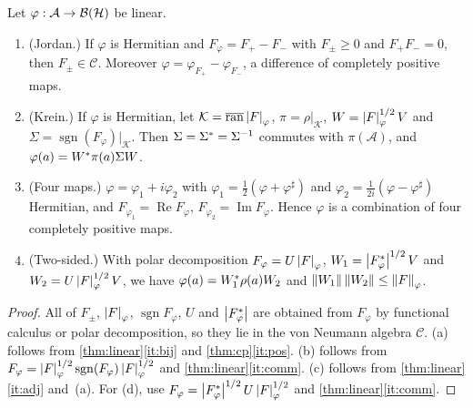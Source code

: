 \documentclass[12pt]{article}
\newcommand{\alg}{\mathcal{A}}             %
\newcommand{\hilb}{\mathcal{H}}            %
\newcommand{\dil}{\mathcal{K}}             %
\newcommand{\bdd}[1]{\mathcal{B}\br{#1}}   %
\newcommand{\Fphi}{F_{\varphi}}
\newcommand{\comm}{\mathcal{C}}            %
\newcommand{\ran}{\operatorname{ran}}
\begin{document}
\begin{theorem}
\label{thm:non-cp}
Let \(\varphi : \alg \to \bdd\hilb\) be linear.
\begin{enumerate}[label=(\alph*)]
  \item \label{it:jordan}
    (Jordan.) If \(\varphi\) is Hermitian and \(\Fphi = F_+ - F_-\) with
    \(F_\pm \ge 0\) and \(F_+F_- = 0\), then \(F_\pm \in \comm\). Moreover
    \(\varphi = \varphi_{F_+} - \varphi_{F_-}\), a difference of completely
    positive maps.
  \item \label{it:krein}
    (Krein.) If \(\varphi\) is Hermitian, let \(\dil = \overline{\ran}\abs\Fphi\),
    \(\pi = \rho|_{\dil}\), \(W = \abs\Fphi^{1/2}V\) and
    \(\Sigma = \operatorname{sgn}(\Fphi)|_{\dil}\). Then
    \(\Sigma = \Sigma^* = \Sigma^{-1}\) commutes with \(\pi(\alg)\), and
    \(\varphi(a) = W^*\pi(a)\Sigma W\).
  \item \label{it:four}
    (Four maps.) \(\varphi = \varphi_1 + i\varphi_2\) with
    \(\varphi_1 = \frac12(\varphi + \varphi^\sharp)\) and
    \(\varphi_2 = \frac1{2i}(\varphi - \varphi^\sharp)\) Hermitian, and
    \(F_{\varphi_1} = \operatorname{Re}\Fphi\),
    \(F_{\varphi_2} = \operatorname{Im}\Fphi\). Hence \(\varphi\) is a combination
    of four completely positive maps.
  \item \label{it:two-sided}
    (Two-sided.) With polar decomposition \(\Fphi = U\abs\Fphi\),
    \(W_1 = \abs{\Fphi^\adjoint}^{1/2}V\) and \(W_2 = U\abs\Fphi^{1/2}V\), we have
    \(\varphi(a) = W_1^*\rho(a)W_2\) and \(\norm{W_1}\norm{W_2} \le \norm\Fphi\).
\end{enumerate}
\end{theorem}
\begin{proof}
All of \(F_\pm\), \(\abs\Fphi\), \(\operatorname{sgn}\Fphi\), \(U\) and
\(\abs{\Fphi^\adjoint}\) are obtained from \(\Fphi\) by functional calculus or polar
decomposition, so they lie in the von Neumann algebra \(\comm\). (a) follows from
\cref{thm:linear}\ref{it:bij} and \cref{thm:cp}\ref{it:pos}.
(b) follows from \(\Fphi = \abs\Fphi^{1/2}\operatorname{sgn}(\Fphi)\abs\Fphi^{1/2}\) and
\cref{thm:linear}\ref{it:comm}. (c) follows from \cref{thm:linear}\ref{it:adj}
and~(a). For (d), use
\(\Fphi = \abs{\Fphi^\adjoint}^{1/2}U\abs\Fphi^{1/2}\) and
\cref{thm:linear}\ref{it:comm}.
\end{proof}
\end{document}
